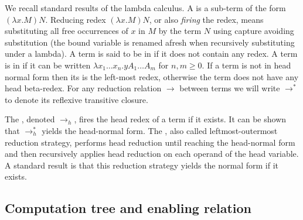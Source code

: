 \documentclass{elsarticle}
\theoremstyle{plain}
\theoremstyle{definition}
\theoremstyle{remark}
\begin{document}
We recall standard results of the lambda calculus.
A  is a sub-term of the form $(\lambda x. M) N$.
Reducing redex $(\lambda x. M) N$, or also \emph{firing} the redex, means substituting all free occurrences of $x$ in $M$ by the term $N$ using capture avoiding substitution (the bound variable is renamed afresh when recursively substituting under a lambda).
A term is said to be in  if it does not contain any redex.
A term is in  if it can be written $\lambda x_1 \ldots x_n . y A_1 \ldots A_m$ for $n,m\geq0$. If a term is not in head normal form then its  is the left-most redex, otherwise the term does not have any head beta-redex. For any reduction relation $\rightarrow$ between terms we will write
$\rightarrow^*$ to denote its reflexive transitive closure.

The , denoted $\rightarrow_{h}$, fires the head redex of a term if it exists. It can be shown that $\rightarrow^*_{h}$ yields the head-normal form. The , also called leftmost-outermost reduction strategy, performs head reduction until reaching the head-normal form and then recursively applies head reduction on each operand of the head variable. A standard result is that this reduction strategy yields the normal form if it exists.


\subsection{Computation tree and enabling relation}
\end{document}
